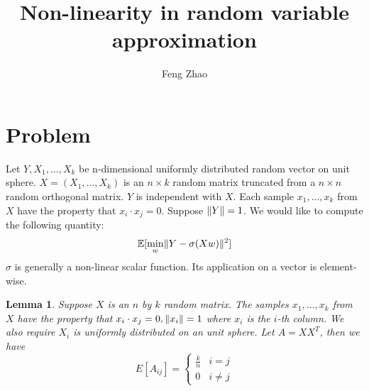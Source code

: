 \documentclass{article}
\title{Non-linearity in random variable approximation}
\author{Feng Zhao}
\DeclarePairedDelimiter\norm{\lVert}{\rVert}
\def\E{\mathbb{E}}
\newtheorem{lemma}{Lemma}
\begin{document}
\maketitle
\section{Problem}
Let $Y, X_1, \dots, X_k$ be n-dimensional uniformly distributed random vector on unit sphere. $X=(X_1, \dots, X_k)$ is an $n\times k$ random matrix truncated from a $n\times n$ random orthogonal matrix. $Y$ is independent with $X$. Each sample $x_1, \dots, x_k$ from $X$ have the property that $x_i \cdot x_j = 0$. Suppose $\norm{Y}=1$. We would like to compute the following quantity:
\begin{equation}\label{eq:Eminw}
\E[\min_w \norm{Y - \sigma (X w ) }^2]
\end{equation}
$\sigma$ is generally a non-linear scalar function. Its application on a vector is element-wise.
\begin{lemma}\label{lem:uniform}
Suppose $X$ is an $n$ by $k$ random matrix. The samples $x_1, \dots, x_k$ from $X$ have the property that $x_i \cdot x_j = 0, \norm{x_i}=1$ where $x_i$ is the $i$-th column.  We also require $X_i$ is uniformly distributed on an unit sphere. Let $A=X X^T$, then we have
\begin{equation}
E[A_{ij}]= \begin{cases}
\frac{k}{n} & i = j\\
0 & i\neq j 
\end{cases}
\end{equation}
\end{lemma}
\end{document}
